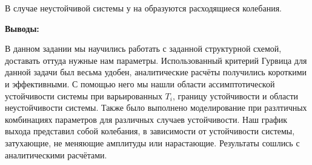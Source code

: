 \begin{par}
\begin{flushleft}
В случае неустойчивой системы у на образуются расходящиеся колебания.
\end{flushleft}
\end{par}

\begin{par}
\begin{flushleft}
\textbf{Выводы:}
\end{flushleft}
\end{par}

\begin{par}
\begin{flushleft}
В данном задании мы научились работать с заданной структурной схемой, доставать оттуда нужные нам параметры. Использованный критерий Гурвица для данной задачи был весьма удобен, аналитические расчёты получились короткими и эффективными. С помощью него мы нашли области ассимптотической устойчивости системы при варьированных $T_i$, границу устойчивости и области неустойчивости системы. Также было выполнено моделирование при разлтичных комбинациях параметров для различных случаев устойчивости. Наш график выхода представил собой колебания, в зависимости от устойчивости системы, затухающие, не меняющие амплитуды или нарастающие. Результаты сошлись с аналитическими расчётами.
\end{flushleft}
\end{par}

